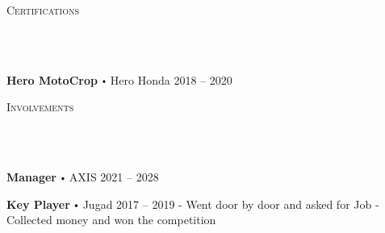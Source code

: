 \documentclass{article}
\newcommand{\lineunder}{
      \vspace*{-8pt} \\ \hspace*{-18pt} 
      \hrulefill \\
      }
\newcommand{\header}[1]{{
      \hspace*{-15pt}\vspace*{6pt} \textsc{#1}} \vspace*{-6pt} 
      \lineunder
      }
\renewcommand{\labelitemi}{
      $\vcenter{\hbox{\tiny$\bullet$}}$\hspace*{3pt}
      }
\renewcommand{\labelitemii}{
      $\vcenter{\hbox{\tiny$\bullet$}}$\hspace*{-3pt}
      }
\newenvironment{bullet-list-major}{
        \begin{list}{\labelitemii}{\setlength\leftmargin{3pt} 
        \topsep 0pt \itemsep -2pt}}{\vspace*{4pt}\end{list}
        }
\begin{document}
    \vspace*{4pt}%
    \header{Certifications}
    {
      \begin{bullet-list-major}
      \item \textbf{Hero MotoCrop} \labelitemi Hero Honda \hfill 2018 -- 2020
      \end{bullet-list-major}
      }
    \vspace*{4pt}%
    \header{Involvements}
    {
          \begin{bullet-list-major}
          \item \textbf{Manager} \labelitemi AXIS \hfill 2021 -- 2028
          
          \end{bullet-list-major}
          

          \begin{bullet-list-major}
          \item \textbf{Key Player} \labelitemi Jugad \hfill 2017 -- 2019
          \newline -{ Went door by door and asked for Job
}\newline -{ Collected money and won the competition}
          \end{bullet-list-major}
          }
    
\end{document}
